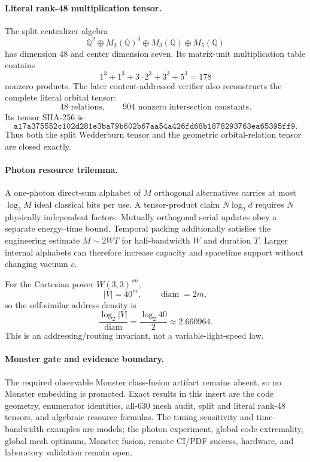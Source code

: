 \paragraph{Literal rank-48 multiplication tensor.}
The split centralizer algebra
\[
 \boxed{\mathbb Q^2\oplus M_2(\mathbb Q)^3\oplus M_3(\mathbb Q)\oplus M_5(\mathbb Q)}
\]
has dimension 48 and center dimension seven.  Its matrix-unit multiplication table contains
\[
 1^3+1^3+3\cdot2^3+3^3+5^3=178
\]
nonzero products.  The later content-addressed verifier also reconstructs the complete literal orbital tensor:
\[
 \boxed{48\text{ relations},\qquad904\text{ nonzero intersection constants}.}
\]
Its tensor SHA-256 is
\[
 \mathtt{a17a375552c102d281e3ba79b602b67aa54a426fd68b1878293763ea65395ff9}.
\]
Thus both the split Wedderburn tensor and the geometric orbital-relation tensor are closed exactly.

\paragraph{Photon resource trilemma.}
A one-photon direct-sum alphabet of $M$ orthogonal alternatives carries at most $\log_2M$ ideal classical bits per use.  A tensor-product claim $N\log_2d$ requires $N$ physically independent factors.  Mutually orthogonal serial updates obey a separate energy--time bound.  Temporal packing additionally satisfies the engineering estimate $M\sim2WT$ for half-bandwidth $W$ and duration $T$.  Larger internal alphabets can therefore increase capacity and spacetime support without changing vacuum $c$.

For the Cartesian power $W(3,3)^{\square m}$,
\[
 |V|=40^m,\qquad \operatorname{diam}=2m,
\]
so the self-similar address density is
\[
 \boxed{\frac{\log_2|V|}{\operatorname{diam}}=\frac{\log_2 40}{2}\approx2.660964.}
\]
This is an addressing/routing invariant, not a variable-light-speed law.

\paragraph{Monster gate and evidence boundary.}
The required observable Monster class-fusion artifact remains absent, so no Monster embedding is promoted.  Exact results in this insert are the code geometry, enumerator identities, all-630 mesh audit, split and literal rank-48 tensors, and algebraic resource formulas.  The timing sensitivity and time-bandwidth examples are models; the photon experiment, global code extremality, global mesh optimum, Monster fusion, remote CI/PDF success, hardware, and laboratory validation remain open.
